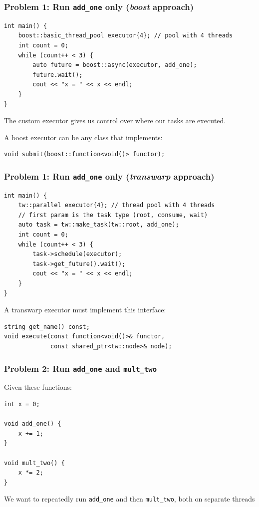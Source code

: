\documentclass[12pt,aspectratio=169]{beamer}
\begin{document}
\begin{frame}[fragile]
\frametitle{Problem 1: Run \lstinline{add_one} only (\textit{boost} approach)}

\begin{lstlisting}
int main() {
    boost::basic_thread_pool executor{4}; // pool with 4 threads
    int count = 0;
    while (count++ < 3) {
        auto future = boost::async(executor, add_one);
        future.wait();
        cout << "x = " << x << endl;
    }
}
\end{lstlisting}
\bigskip

The custom executor gives us control over where our tasks are executed.

A boost executor can be any class that implements:
\begin{lstlisting}
void submit(boost::function<void()> functor);
\end{lstlisting}
\end{frame}

\begin{frame}[fragile]
\frametitle{Problem 1: Run \lstinline{add_one} only (\textit{transwarp} approach)}

\begin{lstlisting}
int main() {
    tw::parallel executor{4}; // thread pool with 4 threads
    // first param is the task type (root, consume, wait)
    auto task = tw::make_task(tw::root, add_one);
    int count = 0;
    while (count++ < 3) {
        task->schedule(executor);
        task->get_future().wait();
        cout << "x = " << x << endl;
    }
}
\end{lstlisting}

A transwarp executor must implement this interface:
\begin{lstlisting}
string get_name() const;
void execute(const function<void()>& functor, 
             const shared_ptr<tw::node>& node);
\end{lstlisting}
\end{frame}

\begin{frame}[fragile]
\frametitle{Problem 2: Run \lstinline{add_one} and \lstinline{mult_two}}

Given these functions:

\begin{lstlisting}
int x = 0;

void add_one() {
    x += 1;
}

void mult_two() {
    x *= 2;
}
\end{lstlisting}
\medskip

We want to repeatedly run \lstinline{add_one} and then \lstinline{mult_two}, both on separate threads

\end{frame}
\end{document}
